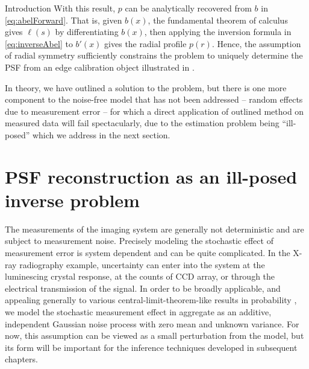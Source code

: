 \begin{chapter}{Introduction}
  With this result, $p$ can be analytically recovered from $b$ in \eqref{eq:abelForward}. 
  That is, given $b(x)$, the fundamental theorem of calculus gives $\ell(s)$ by differentiating $b(x)$, then applying the inversion formula in \eqref{eq:inverseAbel} to $b'(x)$ gives the radial profile $p(r)$.
  Hence, the assumption of radial symmetry sufficiently constrains the problem to uniquely determine the PSF from an edge calibration object illustrated in .

  In theory, we have outlined a solution to the problem, but there is one more component to the noise-free model that has not been addressed -- random effects due to measurement error -- for which a direct application of outlined method on measured data will fail spectacularly, due to the estimation problem being ``ill-posed'' which we address in the next section.

\section{PSF reconstruction as an ill-posed inverse problem}
  The measurements of the imaging system are generally not deterministic and are subject to measurement noise.
  Precisely modeling the stochastic effect of measurement error is system dependent and can be quite complicated.
  In the X-ray radiography example, uncertainty can enter into the system at the luminescing crystal response, at the counts of CCD array, or through the electrical transmission of the signal.
  In order to be broadly applicable, and appealing generally to various central-limit-theorem-like results in probability \citep{durrett2010probability}, we model the stochastic measurement effect in aggregate as an additive, independent Gaussian noise process with zero mean and unknown variance.  
  For now, this assumption can be viewed as a small perturbation from the model, but its form will be important for the inference techniques developed in subsequent chapters.


\end{chapter}
